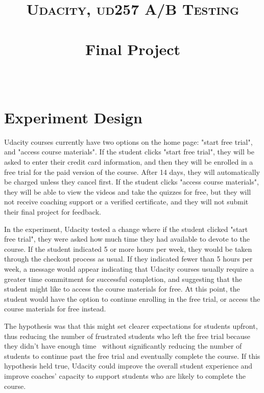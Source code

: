 \documentclass[paper=a4, fontsize=11pt]{scrartcl} %
\title{	
\normalfont \normalsize 
\textsc{Udacity, ud257 A/B Testing} \\ [25pt] %
\horrule{0.5pt} \\[0.4cm] %
\huge Final Project \\ %
\horrule{2pt} \\[0.5cm] %
}
\numberwithin{equation}{section} %
\numberwithin{figure}{section} %
\numberwithin{table}{section} %
\begin{document}
\maketitle %


\section{Experiment Design}

Udacity courses currently have two options on the home page: "start free trial", and "access course materials". If the student clicks "start free trial", they will be asked to enter their credit card information, and then they will be enrolled in a free trial for the paid version of the course. After 14 days, they will automatically be charged unless they cancel first. If the student clicks "access course materials", they will be able to view the videos and take the quizzes for free, but they will not receive coaching support or a verified certificate, and they will not submit their final project for feedback.
\newline

In the experiment, Udacity tested a change where if the student clicked "start free trial", they were asked how much time they had available to devote to the course. If the student indicated 5 or more hours per week, they would be taken through the checkout process as usual. If they indicated fewer than 5 hours per week, a message would appear indicating that Udacity courses usually require a greater time commitment for successful completion, and suggesting that the student might like to access the course materials for free. At this point, the student would have the option to continue enrolling in the free trial, or access the course materials for free instead.
\newline

The hypothesis was that this might set clearer expectations for students upfront, thus reducing the number of frustrated students who left the free trial because they didn't have enough time \textemdash \ without significantly reducing the number of students to continue past the free trial and eventually complete the course. If this hypothesis held true, Udacity could improve the overall student experience and improve coaches' capacity to support students who are likely to complete the course.
\newline
\end{document}
